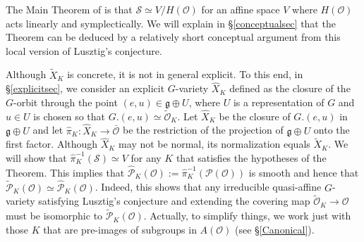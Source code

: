 \documentclass{amsart}
\theoremstyle{definition}
\newcommand{\C}{\mathbb{C}}
\newcommand{\cP}{\mathcal{P}}
\newcommand{\cS}{\mathcal{S}}
\newcommand{\covP}{\widetilde{\mathcal{P}}}
\newcommand{\g}{\mathfrak{g}}
\newcommand{\0}{\mathcal{O}}
\begin{document}
The Main Theorem of \cite{FJLS23} is that $\cS \simeq V/H(\0)$ for an affine space $V$ where $H(\0)$ acts linearly and symplectically. 
 We will explain in \S \ref{conceptualsec} that the Theorem can be deduced by a relatively short conceptual argument from this local version of Lusztig's conjecture. 

 Although $\widetilde{X}_K$ is concrete, it is not in general explicit.
To this end, in \S \ref{explicitsec}, 
we consider an explicit $G$-variety $\hat{X}_K$ defined as the closure of 
the $G$-orbit through the point $(e,u) \in \g\oplus U$, where $U$ is a representation of $G$ and $u \in U$ is chosen so that $G.(e,u) \simeq \widetilde{\0}_K$. 
Let $\hat{X}_K$ be the closure of $G.(e,u)$ in $\g \oplus U$ and 
let $\hat\pi_K:\hat{X}_K \to \bar{\0}$ be the restriction of the projection 
of $\g\oplus U$ onto the first factor.  Although $\hat{X}_K$ may not be normal,
its normalization equals $\widetilde{X}_K$.
We will show that $\hat\pi_K^{-1}(\cS) \simeq V$ for any $K$ that 
satisfies the hypotheses of the Theorem.  
This implies that $\hat{\mathcal P}_K(\0):=\hat \pi^{-1}_K({\cP(\0)})$ is smooth
and hence that $\covP_K(\0) \simeq \hat{\mathcal P}_K(\0)$. 
Indeed, this shows that 
any irreducible quasi-affine $G$-variety satisfying 
Lusztig's conjecture and extending the covering map $\widetilde{\0}_K \to \0$ must be isomorphic to $\covP_K(\0)$.  
Actually, to simplify things, we work just with those $K$ that are pre-images of
subgroups in $A(\0)$  (see \S\ref{Canonical}).
\end{document}
